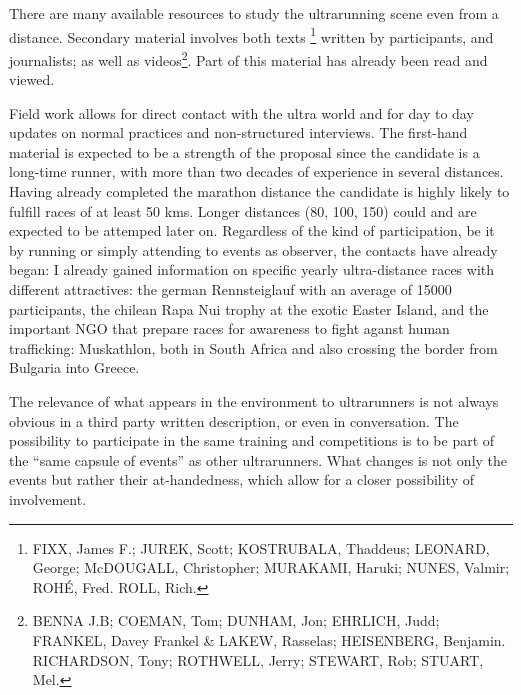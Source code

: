 There are many available resources to study the ultrarunning scene even from a distance.
Secondary material involves both texts%
\footnote{FIXX, James F.; JUREK, Scott; KOSTRUBALA, Thaddeus; LEONARD, George; McDOUGALL, Christopher; MURAKAMI, Haruki; NUNES, Valmir; ROHÉ, Fred. ROLL, Rich.}  
written by participants, and journalists; as well as videos\footnote{BENNA J.B; COEMAN, Tom; DUNHAM, Jon; EHRLICH, Judd; FRANKEL, Davey Frankel \& LAKEW, Rasselas; HEISENBERG, Benjamin. RICHARDSON, Tony; ROTHWELL, Jerry; STEWART, Rob; STUART, Mel.}.
Part of this material has already been read and viewed. 

Field work allows for direct contact with the ultra world and for day to day updates on normal practices and non-structured interviews. The first-hand material is expected to be a strength of the proposal since the candidate is a long-time runner, with more than two decades of experience in several distances. Having already completed the marathon distance the candidate is highly likely to fulfill races of at least 50 kms. Longer distances (80, 100, 150) could and are expected to be attemped later on. 
Regardless of the kind of participation, be it by running or simply attending to events as observer, the contacts have already began: I already gained information on specific yearly ultra-distance races with different attractives:
the german Rennsteiglauf with an average of 15000 participants, the chilean Rapa Nui trophy at the exotic Easter Island,
and the important NGO that prepare races for awareness to fight aganst human trafficking: Muskathlon, both in South Africa and also crossing the border from Bulgaria into Greece.

The relevance of what appears in the environment to ultrarunners is not always obvious in a third party written description, or even in conversation. The possibility to participate in the same training and competitions is to be part of the “same capsule of events” as other ultrarunners. What changes is not only the events but rather their at-handedness, which allow for a closer possibility of involvement.

